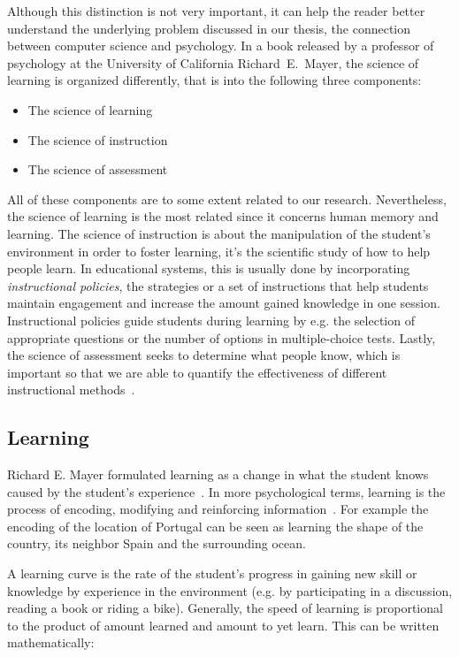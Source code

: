 Although this distinction is not very important, it can help the reader better understand the underlying problem discussed in our thesis, the connection between computer science and psychology. In a book released by a professor of psychology at the University of California Richard~E.~Mayer, the science of learning is organized differently, that is into the following three components:

\begin{itemize}
  \item The science of learning
  \item The science of instruction
  \item The science of assessment
\end{itemize}

All of these components are to some extent related to our research. Nevertheless, the science of learning is the most related since it concerns human memory and learning. The science of instruction is about the manipulation of the student's environment in order to foster learning, it's the scientific study of how to help people learn. In educational systems, this is usually done by incorporating \textit{instructional policies}, the strategies or a set of instructions that help students maintain engagement and increase the amount gained knowledge in one session. Instructional policies guide students during learning by e.g. the selection of appropriate questions or the number of options in multiple-choice tests. Lastly, the science of assessment seeks to determine what people know, which is important so that we are able to quantify the effectiveness of different instructional methods~\cite{RichardE.Mayer2010}.

\subsection{Learning}
\label{learning}

Richard E. Mayer formulated learning as a change in what the student knows caused by the student's experience~\cite{RichardE.Mayer2010}. In more psychological terms, learning is the process of encoding, modifying and reinforcing information~\cite{Lewis}. For example the encoding of the location of Portugal can be seen as learning the shape of the country, its neighbor Spain and the surrounding ocean.

A learning curve is the rate of the student's progress in gaining new skill or knowledge by experience in the environment (e.g. by participating in a discussion, reading a book or riding a bike). Generally, the speed of learning is proportional to the product of amount learned and amount to yet learn. This can be written mathematically:

